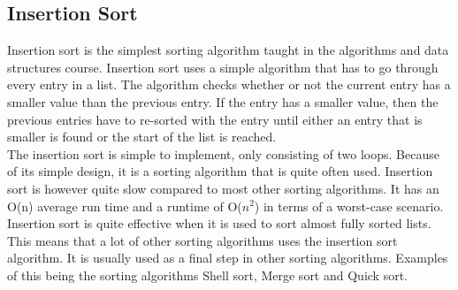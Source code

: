 \subsection{Insertion Sort}
Insertion sort is the simplest sorting algorithm taught in the algorithms and data structures course. Insertion sort uses a simple algorithm that has to go through every entry in a list. The algorithm checks whether or not the current entry has a smaller value than the previous entry. If the entry has a smaller value, then the previous entries have to re-sorted with the entry until either an entry that is smaller is found or the start of the list is reached.
\\[11pt]
The insertion sort is simple to implement, only consisting of two loops. Because of its simple design, it is a sorting algorithm that is quite often used. Insertion sort is however quite slow compared to most other sorting algorithms. It has an O(n) average run time and a runtime of O($n^2$) in terms of a worst-case scenario.
\\[11pt]
Insertion sort is quite effective when it is used to sort almost fully sorted lists. This means that a lot of other sorting algorithms uses the insertion sort algorithm. It is usually used as a final step in other sorting algorithms. Examples of this being the sorting algorithms Shell sort, Merge sort and Quick sort.